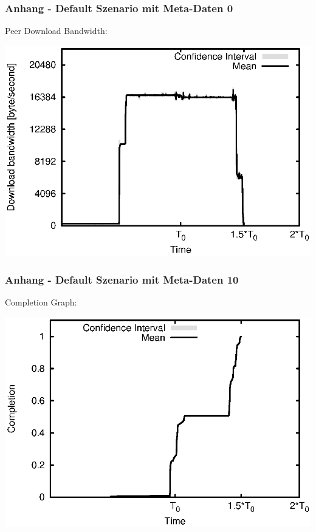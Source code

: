 \begin{frame}
  \frametitle{Anhang - Default Szenario mit Meta-Daten 0}
  Peer Download Bandwidth:
  
  \begin{center}
    \includegraphics[width=1\textwidth]{fig/plots/scenario_5_meta_data_0/plots/GeneratedMeanCurrentDownloadBandwidth.csv.eps}
  \end{center}
\end{frame}



\begin{frame}
  \frametitle{Anhang - Default Szenario mit Meta-Daten 10}
  Completion Graph:
  
  \begin{center}
    \includegraphics[width=1\textwidth]{fig/plots/scenario_10_meta_data_10/plots/GeneratedMeanChunkCompletion.csv.eps}
  \end{center}
\end{frame}


